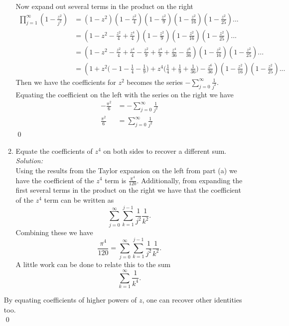 \documentclass[10pt]{amsart}
\theoremstyle{nonumberplain}
\begin{document}
\begin{enumerate}[label={\bf {\arabic*}:}]
\begin{enumerate}
Now expand out several terms in the product on the right
\begin{align*}
\prod_{j=1}^{\infty}\left(1-\frac{z^2}{j^2}\right)
	&= \left( 1 - z^2\right)\left( 1 - \frac{z^2}{4}\right)\left( 1 - \frac{z^2}{9}\right)\left( 1 - \frac{z^2}{16}\right)\left( 1 - \frac{z^2}{25}\right)... \\
	&= \left( 1 - z^2 - \frac{z^2}{4} + \frac{z^4}{4} \right)\left( 1 - \frac{z^2}{9}\right)\left( 1 - \frac{z^2}{16}\right)\left( 1 - \frac{z^2}{25}\right)... \\
	&= \left( 1 - z^2 - \frac{z^2}{4} + \frac{z^4}{4} - \frac{z^2}{9} + \frac{z^4}{9} + \frac{z^4}{36} -\frac{z^6}{36} \right)\left( 1 - \frac{z^2}{16}\right)\left( 1 - \frac{z^2}{25}\right)... \\
	&= \left( 1 + z^2\Big( -1 - \frac 1 4 - \frac 1 9\Big) + z^4 \Big( \frac 1 {4} + \frac 1 {9} + \frac 1 {36} \Big) - \frac{z^6}{36} \right)\left( 1 - \frac{z^2}{16}\right)\left( 1 - \frac{z^2}{25}\right)...
\end{align*}
Then we have the coefficients for $z^2$ becomes the series $ - \sum_{j = 0}^\infty \frac 1 {j^2}. $
Equating the coefficient on the left with the series on the right we have
\begin{align*}
-\frac {\pi^2} 6 &= - \sum_{j = 0}^\infty \frac 1 {j^2} \\
\frac {\pi^2} 6 &= \sum_{j = 0}^\infty \frac 1 {j^2}
\end{align*} \qed \\

\newpage

\item Equate the coefficients of $z^4$ on both sides to recover a
  different sum. \\

\noindent
\textit{Solution:} \\
Using the results from the Taylor expansion on the left from part (a) we have the coefficient of the $z^4$ term is $ \frac {\pi^4}{120}. $
Additionally, from expanding the first several terms in the product on the right we have that the coefficient of the $z^4$ term can be written as
$$\sum_{j=0}^\infty \sum_{k=1}^{j - 1} \frac 1 {j^2} \frac 1 {k^2}.$$
Combining these we have 
$$\frac {\pi^4}{120} = \sum_{j=0}^\infty \sum_{k=1}^{j - 1} \frac 1 {j^2} \frac 1 {k^2}.$$
A little work can be done to relate this to the sum
$$\sum_{k=1}^\infty \frac 1 {k^4}.$$
\end{enumerate}
By equating coefficients of higher powers of $z$, one can recover
other identities too.\\
\qed \\


\end{enumerate}
\end{document}
